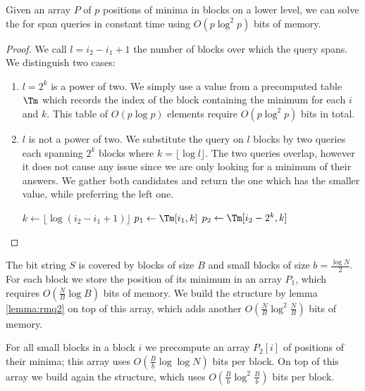 \begin{lemma}\label{lemma:rmq2}
	Given an array $P$ of $p$ positions of minima in blocks on a lower level, we can solve the \rmqi{} for span queries in constant time using $O(p \log^2 p)$ bits of memory.
\end{lemma}
\begin{proof}
	We call $l = i_2 - i_1 + 1$ the number of blocks over which the query spans.
	We distinguish two cases:
	\begin{enumerate}
		\item $l = 2^k$ is a power of two.
		We simply use a value from a precomputed table $\Tm$ which records the index of the block containing the minimum for each $i$ and $k$.
		This table of $O(p \log p)$ elements require $O(p \log^2 p)$ bits in total.
		
		\item $l$ is not a power of two.
		We substitute the query on $l$ blocks by two queries each spanning $2^k$ blocks where $k = \lfloor \log l \rfloor$.
		The two queries overlap, however it does not cause any issue since we are only looking for a minimum of their answers.
		We gather both candidates and return the one which has the smaller value, while preferring the left one.
		
		\begin{algorithm}
		\begin{algorithmic}
		 
			\State $k \gets \lfloor \log (i_2 - i_1 + 1) \rfloor$
			\State $p_1 \gets \Tm[i_1, k]$
			\State $p_2 \gets \Tm[i_2 - 2^k, k]$
				\State {}
			\Else
				\State {}
			\EndIf
		\EndFunction
		\end{algorithmic}
		\end{algorithm}
	\end{enumerate}
\end{proof}

The bit string $S$ is covered by blocks of size $B$ and small blocks of size $b = \frac{\log N}{2}$.
For each block we store the position of its minimum in an array $P_1$, which requires $O\left(\frac{N}{B} \log B\right)$ bits of memory.
We build the \rmqi{} structure by lemma \ref{lemma:rmq2} on top of this array, which adds another $O\left(\frac{N}{B} \log^2 \frac{N}{B}\right)$ bits of memory.

For all small blocks in a block $i$ we precompute an array $P_2[i]$ of positions of their minima; this array uses $O\left(\frac{B}{b} \log \log N\right)$ bits per block.
On top of this array we build again the \rmqi{} structure, which uses $O\left(\frac{B}{b} \log^2 \frac{B}{b}\right)$ bits per block.


